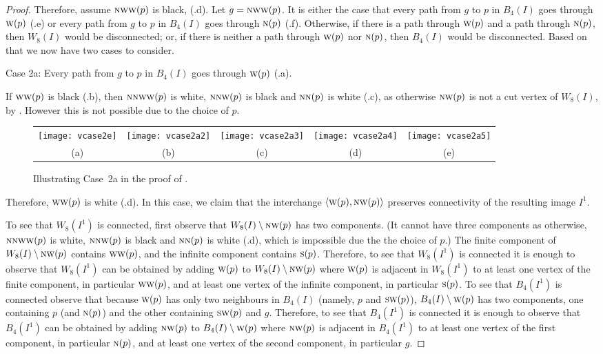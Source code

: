 \documentclass[lotsofwhite,charterfonts]{patmorin}
\newcommand{\N}{\textsc{n}}
\renewcommand{\S}{\textsc{s}}
\newcommand{\SW}{\textsc{sw}}
\newcommand{\W}{\textsc{w}}
\newcommand{\NW}{\textsc{nw}}
\newcommand{\ic}[2]{\langle #1,#2 \rangle}
\newcommand{\sm}{\ensuremath{\setminus}}
\begin{document}
\begin{proof}
Therefore, assume $\NW\W(p)$ is black, (.d). Let
$g=\NW\W(p)$. It is either the case that every path from $g$ to $p$ in
$B_4(I)$ goes through $\W(p)$  (.e) or every path from
$g$ to $p$ in $B_4(I)$ goes through $\N(p)$
(.f). Otherwise, if there is a path through
$\W(p)$ and a path through $\N(p)$, then $W_8(I)$ would be
disconnected; or, if there is neither a path through $\W(p)$ nor
$\N(p)$, then $B_4(I)$ would be disconnected. Based on that we now
have two cases to consider.

\noindent Case 2a: Every path from $g$ to $p$ in $B_4(I)$ goes through
$\W(p)$ (.a). 

If $\W\W(p)$ is black (.b), then $\N\N\W\W(p)$ is white,
$\N\N\W(p)$ is black and  $\N\N(p)$ is white (.c), as
otherwise $\NW(p)$ is not a cut vertex of $W_8(I)$, by
. However this is not possible due to the choice of
$p$.

\begin{figure}[htbp]
\begin{center}
\begin{tabular}{ccccc}
\texttt{[image: vcase2e]} & 
\texttt{[image: vcase2a2]} & 
\texttt{[image: vcase2a3]} & 
\texttt{[image: vcase2a4]} &
\texttt{[image: vcase2a5]}
\\
(a) & (b) & (c) & (d) & (e)
\end{tabular}
\end{center}
\caption{Illustrating Case~2a in the proof of .}
\end{figure}

Therefore,  $\W\W(p)$ is white (.d). In this case, we claim that the interchange $\ic{\W(p)}{\NW(p)}$ preserves connectivity of the resulting image $I^1$. 


To see that $W_8(I^1)$ is connected, first observe that $W_8(I)\sm \NW(p)$ has two components. (It cannot have three components as otherwise,  $\N\N\W\W(p)$ is white, $\N\N\W(p)$ is black and  $\N\N(p)$ is white (.d), which  is impossible due the the choice of $p$.) The finite component of $W_8(I)\sm \NW(p)$ contains $\W\W(p)$, and the infinite component contains $\S(p)$. Therefore, to see that $W_8(I^1)$ is connected it is enough to observe that $W_8(I^1)$ can be obtained by adding $\W(p)$ to $W_8(I)\sm \NW(p)$ where $\W(p)$ is adjacent in $W_8(I^1)$ to at least one vertex of the finite component, in particular $\W\W(p)$, and at least one vertex of the infinite component, in particular $\S(p)$. To see that $B_4(I^1)$ is connected observe that because $\W(p)$ has only two neighbours in $B_4(I)$ (namely, $p$ and $\SW(p)$), $B_4(I)\sm \W(p)$ has two components, one containing $p$ (and $\N(p)$) and the other containing $\SW(p)$ and $g$. Therefore, to see that $B_4(I^1)$ is connected it is enough to observe that $B_4(I^1)$ can be obtained by adding $\NW(p)$ to $B_4(I)\sm \W(p)$ where $\NW(p)$ is adjacent in $B_4(I^1)$ to at least one vertex of the first component, in particular $\N(p)$, and at least one vertex of the second component, in particular $g$. 



\end{proof}
\end{document}
